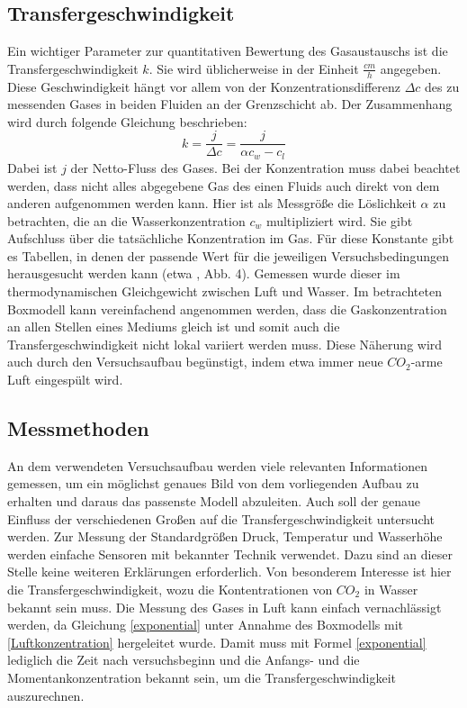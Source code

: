 \documentclass[12pt]{article}
\begin{document}
\subsection{Transfergeschwindigkeit}
Ein wichtiger Parameter zur quantitativen Bewertung des Gasaustauschs ist die Transfergeschwindigkeit $k$. Sie wird üblicherweise in der Einheit $\frac{cm}{h}$ angegeben.
Diese Geschwindigkeit hängt vor allem von der Konzentrationsdifferenz $\Delta c$ des zu messenden Gases in beiden Fluiden an der Grenzschicht ab. Der Zusammenhang wird durch folgende Gleichung beschrieben: 
\begin{equation}\label{transfergeschwindigkeit}
	k = \frac{j}{\Delta c} = \frac{j}{\alpha c_w - c_l}
\end{equation}
Dabei ist $j$ der Netto-Fluss des Gases.
Bei der Konzentration muss dabei beachtet werden, dass nicht alles abgegebene Gas des einen Fluids auch direkt von dem anderen aufgenommen werden kann. Hier ist als Messgröße die Löslichkeit $\alpha$ zu betrachten, die an die Wasserkonzentration $c_w$ multipliziert wird. Sie gibt Aufschluss über die tatsächliche Konzentration im Gas. Für diese Konstante gibt es Tabellen, in denen der passende Wert für die jeweiligen Versuchsbedingungen herausgesucht werden kann (etwa \cite{jaehne}, Abb. 4). Gemessen wurde dieser im thermodynamischen Gleichgewicht  zwischen Luft und Wasser.
Im betrachteten Boxmodell kann vereinfachend angenommen werden, dass die Gaskonzentration an allen Stellen eines Mediums gleich ist und somit auch die Transfergeschwindigkeit nicht lokal variiert werden muss.
Diese Näherung wird auch durch den Versuchsaufbau begünstigt, indem etwa immer neue $CO_2$-arme Luft eingespült wird.

\subsection{Messmethoden}
An dem verwendeten Versuchsaufbau werden viele relevanten Informationen gemessen, um ein möglichst genaues Bild von dem vorliegenden Aufbau zu erhalten und daraus das passenste Modell abzuleiten. Auch soll der genaue Einfluss der verschiedenen Großen auf die Transfergeschwindigkeit untersucht werden. 
Zur Messung der Standardgrößen Druck, Temperatur und Wasserhöhe werden einfache Sensoren mit bekannter Technik verwendet. Dazu sind an dieser Stelle keine weiteren Erklärungen erforderlich.
Von besonderem Interesse ist hier die Transfergeschwindigkeit, wozu die Kontentrationen von $CO_2$ in Wasser bekannt sein muss. Die Messung des Gases in Luft kann einfach vernachlässigt werden, da Gleichung \eqref{exponential} unter Annahme des Boxmodells mit \ref{Luftkonzentration} hergeleitet wurde.
Damit muss mit Formel \ref{exponential} lediglich die Zeit nach versuchsbeginn und die Anfangs- und die Momentankonzentration bekannt sein, um die Transfergeschwindigkeit auszurechnen. \\
\end{document}

